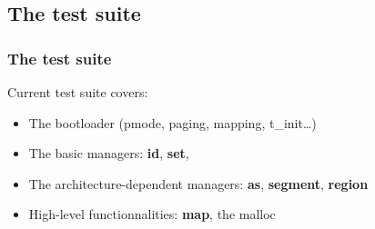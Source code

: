 %
%

\subsection{The test suite}


\begin{frame}
  \frametitle{The test suite}

  Current test suite covers:

  \begin{itemize}
  \item The bootloader (pmode, paging, mapping, t\_init\ldots)
  \item The basic managers: \textbf{id}, \textbf{set},
  \item The architecture-dependent managers: \textbf{as}, \textbf{segment}, \textbf{region}
  \item High-level functionnalities: \textbf{map}, the malloc
  \end{itemize}
\end{frame}


